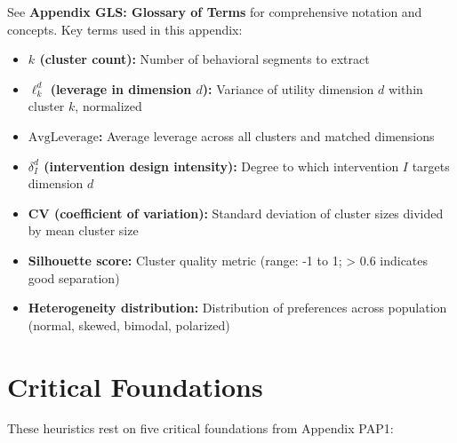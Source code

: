 See \textbf{Appendix GLS: Glossary of Terms} for comprehensive notation and concepts. Key terms used in this appendix:

\begin{itemize}[nosep]
\item \textbf{$k$ (cluster count):} Number of behavioral segments to extract
\item \textbf{$\ell_k^d$ (leverage in dimension $d$):} Variance of utility dimension $d$ within cluster $k$, normalized
\item \textbf{$\text{AvgLeverage}$:} Average leverage across all clusters and matched dimensions
\item \textbf{$\delta_I^d$ (intervention design intensity):} Degree to which intervention $I$ targets dimension $d$
\item \textbf{CV (coefficient of variation):} Standard deviation of cluster sizes divided by mean cluster size
\item \textbf{Silhouette score:} Cluster quality metric (range: -1 to 1; > 0.6 indicates good separation)
\item \textbf{Heterogeneity distribution:} Distribution of preferences across population (normal, skewed, bimodal, polarized)
\end{itemize}


\section{Critical Foundations}
\label{sec:h-foundations}

These heuristics rest on five critical foundations from Appendix PAP1:

